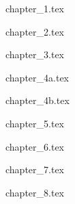 \documentclass[10pt]{extarticle}
\begin{document}
  \begin{multicols}{2}

    {chapter_1.tex}
    \newpage

    {chapter_2.tex}
    \newpage

    {chapter_3.tex}
    \newpage

    {chapter_4a.tex}
    \newpage

    {chapter_4b.tex}
    \newpage

    {chapter_5.tex}
    \newpage

    {chapter_6.tex}
    \newpage

    {chapter_7.tex}
    \newpage

    {chapter_8.tex}
    \newpage


  \end{multicols}
\end{document}
